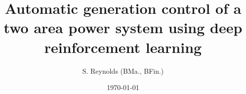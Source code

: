 \documentclass[12pt,oneside]{book}
\begin{document}
    \onehalfspace
  
    \title{Automatic generation control of a two area power system using deep reinforcement learning} 
    \author{S. Reynolds (BMa., BFin.)}
    
    \date{\today} 
    
    
    
    

    \frontmatter
    \maketitle
    \declaration
    
    

    \cleardoublepage
     {} 
    \tableofcontents

	\cleardoublepage
	 \label{listoffigures}
	\listoffigures
	
	\cleardoublepage
	 \label{listoftables} 
	\listoftables

	

	
	
    \cleardoublepage
    \mainmatter
\end{document}
